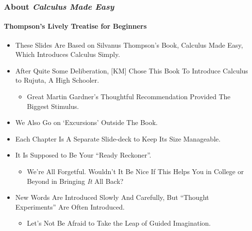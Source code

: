 \begin{frame}
\frametitle{About \textit{Calculus Made Easy}}
\framesubtitle{Thompson's Lively Treatise for Beginners}
\label{slide:intro1}
\begin{itemize}
\pause
\item These Slides Are Based on \alert{Silvanus Thompson's Book, Calculus Made Easy}, Which Introduces Calculus Simply.
\pause
\item After Quite Some Deliberation, [KM] Chose This Book To Introduce Calculus to Rujuta, A High Schooler.
\begin{itemize}
\pause
\item Great \alert{Martin Gardner's Thoughtful Recommendation} Provided The Biggest Stimulus.
\end{itemize}
\pause
\item We Also Go on \alert{`Excursions' Outside The Book}.
\pause
\item Each Chapter Is A Separate Slide-deck to Keep Its Size Manageable.
\pause
\item It Is Supposed to Be Your \alert{``Ready Reckoner''}.
\begin{itemize}
\pause
\item We're All Forgetful. Wouldn't It Be Nice If This Helps You in College or Beyond in \alert{Bringing \textit{It} All Back}?
\end{itemize}
\pause
\item New Words Are Introduced Slowly And Carefully, But \alert{``Thought Experiments''} Are Often Introduced.
\begin{itemize}
\pause
\item Let's \alert{Not Be Afraid to Take the Leap of Guided Imagination}.
\end{itemize}
\end{itemize}
\end{frame}
